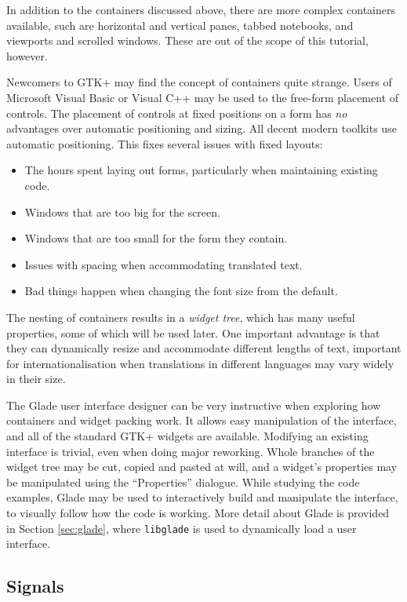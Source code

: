 \documentclass[a4paper,oneside]{article}
\newcommand{\program}[1]{\texttt{#1}}
\begin{document}
In addition to the containers discussed above, there are more complex
containers available, such are horizontal and vertical panes, tabbed
notebooks, and viewports and scrolled windows.  These are out of the
scope of this tutorial, however.

Newcomers to GTK+ may find the concept of containers quite strange.
Users of Microsoft Visual Basic or Visual C++ may be used to the
free-form placement of controls.  The placement of controls at fixed
positions on a form has \emph{no} advantages over automatic
positioning and sizing.  All decent modern toolkits use automatic
positioning.  This fixes several issues with fixed layouts:

\begin{itemize}
\item The hours spent laying out forms, particularly when maintaining
  existing code.
\item Windows that are too big for the screen.
\item Windows that are too small for the form they contain.
\item Issues with spacing when accommodating translated text.
\item Bad things happen when changing the font size from the default.
\end{itemize}

The nesting of containers results in a \emph{widget tree}, which has
many useful properties, some of which will be used later.  One
important advantage is that they can dynamically resize and
accommodate different lengths of text, important for
internationalisation when translations in different languages may vary
widely in their size.

The Glade user interface designer can be very instructive when
exploring how containers and widget packing work.  It allows easy
manipulation of the interface, and all of the standard GTK+ widgets
are available.  Modifying an existing interface is trivial, even when
doing major reworking.  Whole branches of the widget tree may be cut,
copied and pasted at will, and a widget's properties may be
manipulated using the ``Properties'' dialogue.  While studying the
code examples, Glade may be used to interactively build and manipulate
the interface, to visually follow how the code is working.  More
detail about Glade is provided in Section \ref{sec:glade}, where
\program{libglade} is used to dynamically load a user interface.


\subsection{Signals}
\end{document}
